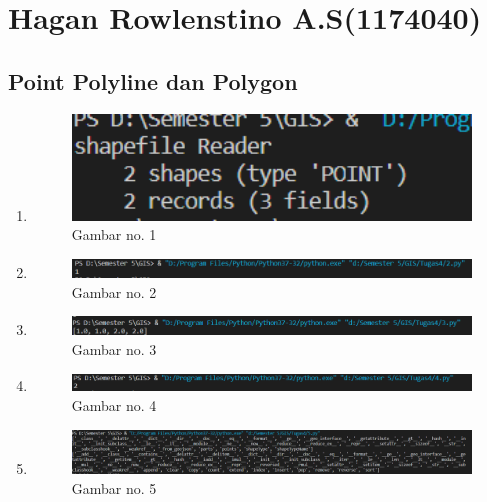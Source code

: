 \section{Hagan Rowlenstino A.S(1174040)}
\subsection{Point Polyline dan Polygon}
\begin{enumerate}
	\item 
	
	\begin{figure}[H]
		\includegraphics[width=12cm]{figures/1174040/Python2/tampilan1.PNG}
		\centering
		\caption{Gambar no. 1}
	\end{figure}
	
	\item 
	
	\begin{figure}[H]
		\includegraphics[width=12cm]{figures/1174040/Python2/tampilan2.PNG}
		\centering
		\caption{Gambar no. 2}
	\end{figure}
	
	\item 
	
	\begin{figure}[H]
		\includegraphics[width=12cm]{figures/1174040/Python2/tampilan3.PNG}
		\centering
		\caption{Gambar no. 3}
	\end{figure}
	
	\item 
	
	\begin{figure}[H]
		\includegraphics[width=12cm]{figures/1174040/Python2/tampilan4.PNG}
		\centering
		\caption{Gambar no. 4}
	\end{figure}
	
	\item 
	
	\begin{figure}[H]
		\includegraphics[width=12cm]{figures/1174040/Python2/tampilan5.PNG}
		\centering
		\caption{Gambar no. 5}
	\end{figure}
	

\end{enumerate}
